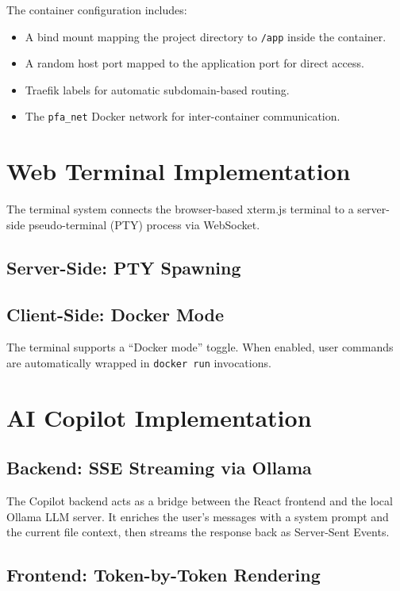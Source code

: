 \documentclass[12pt,a4paper,oneside]{report}
\begin{document}
The container configuration includes:
\begin{itemize}
    \item A bind mount mapping the project directory to \texttt{/app} inside the container.
    \item A random host port mapped to the application port for direct access.
    \item Traefik labels for automatic subdomain-based routing.
    \item The \texttt{pfa\_net} Docker network for inter-container communication.
\end{itemize}

\section{Web Terminal Implementation}

The terminal system connects the browser-based xterm.js terminal to a server-side pseudo-terminal (PTY) process via WebSocket.

\subsection{Server-Side: PTY Spawning}


\subsection{Client-Side: Docker Mode}

The terminal supports a ``Docker mode'' toggle. When enabled, user commands are automatically wrapped in \texttt{docker run} invocations.

\section{AI Copilot Implementation}

\subsection{Backend: SSE Streaming via Ollama}

The Copilot backend acts as a bridge between the React frontend and the local Ollama LLM server. It enriches the user's messages with a system prompt and the current file context, then streams the response back as Server-Sent Events.

\subsection{Frontend: Token-by-Token Rendering}
\end{document}
